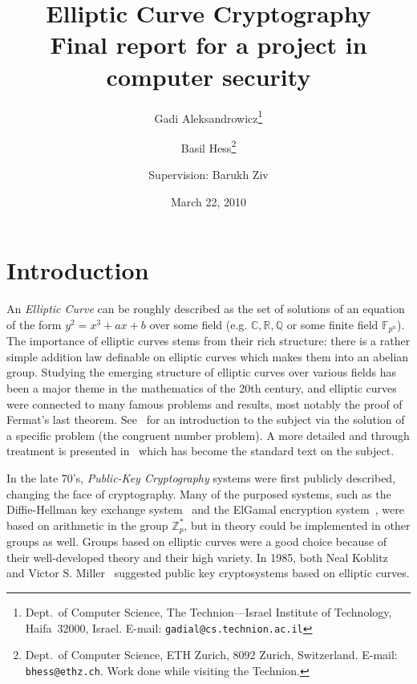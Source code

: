 \documentclass[11pt,english]{article}
\begin{document}

\title{Elliptic Curve Cryptography\\Final report for a project in computer security}
\author{
   Gadi Aleksandrowicz\thanks{
      Dept.\ of Computer Science,
      The Technion---Israel Institute of Technology,
      Haifa~32000, Israel.
      E-mail: {\tt gadial@cs.technion.ac.il}
   } \and
   Basil Hess\thanks{
      Dept.\ of Computer Science,
      ETH Zurich,
      8092 Zurich, Switzerland.
      E-mail: {\tt bhess@ethz.ch}. Work done while visiting the Technion.
   } \and Supervision: Barukh Ziv
}
\date{March 22, 2010}
\maketitle

\section{Introduction}
An \emph{Elliptic Curve} can be roughly described as the set of solutions of an equation of the form $y^2=x^3+ax+b$ over some field (e.g. $\mathbb{C}, 
\mathbb{R},\mathbb{Q}$ or some finite field $\mathbb{F}_{p^n}$). The importance of elliptic curves stems from their rich structure: there is a rather simple
addition law definable on elliptic curves which makes them into an abelian group. Studying the emerging structure of elliptic curves over various fields has been a
major theme in the mathematics of the 20th century, and elliptic curves were connected to many famous problems and results, most notably the proof of Fermat's
last theorem. See~\cite{Ko84} for an introduction to the subject via the solution of a specific problem (the congruent number problem). A more detailed and through
treatment is presented in~\cite{Sil86} which has become the standard text on the subject.

In the late 70's, \emph{Public-Key Cryptography} systems were first publicly described, changing the face of cryptography. Many of the purposed systems, such
as the Diffie-Hellman key exchange system~\cite{Diffie76newdirections} and the ElGamal encryption system~\cite{19480}, were based on arithmetic in the group $\mathbb{Z}^*_p$, but in theory could
be implemented in other groups as well. Groups based on elliptic curves were a good choice because of their well-developed theory and their high variety. In 1985,
both Neal Koblitz~\cite{Ko87} and Victor S. Miller~\cite{Mil85} suggested public key cryptosystems based on elliptic curves.
\end{document}
